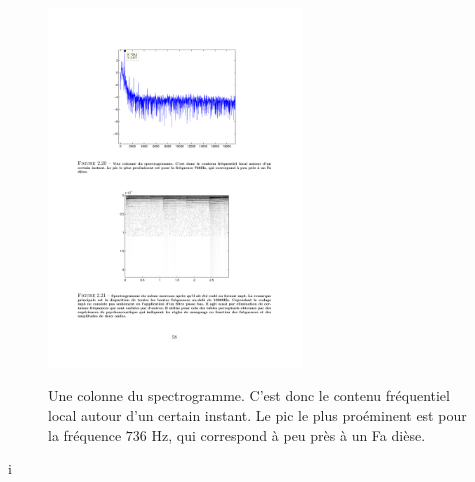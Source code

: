 \begin{figure}
  \centering
  \includegraphics[width=0.6\textwidth]{Figures/Figure2-20}\\
  \caption{Une colonne du spectrogramme. C'est donc le contenu fr\'{e}quentiel local autour d'un certain instant. Le pic le plus pro\'{e}minent est pour la fr\'{e}quence $736$ Hz, qui correspond \`{a} peu pr\`{e}s \`{a} un Fa di\`{e}se.}\label{fig:figure2-20}
\end{figure}

i